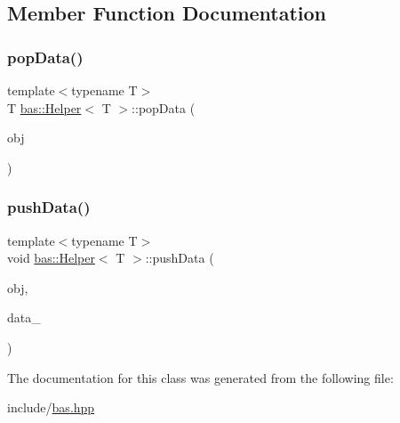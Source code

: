 \subsection{Member Function Documentation}
\mbox{\label{classbas_1_1Helper_a44946c3423be62b6f70556c1792bbc12}} 
\subsubsection{\texorpdfstring{popData()}{popData()}}
{\footnotesize\ttfamily template$<$typename T$>$ \\
T \mbox{\hyperlink{classbas_1_1Helper}{bas\+::\+Helper}}$<$ T $>$\+::pop\+Data (\begin{DoxyParamCaption}\item[{\mbox{\hyperlink{classbas_1_1SerializedObject}{Serialized\+Object}} \&}]{obj }\end{DoxyParamCaption})\hspace{0.3cm}{\ttfamily [inline]}}

\mbox{\label{classbas_1_1Helper_a14a82ecc9aa2a8580322f63dc7afde50}} 
\subsubsection{\texorpdfstring{pushData()}{pushData()}}
{\footnotesize\ttfamily template$<$typename T$>$ \\
void \mbox{\hyperlink{classbas_1_1Helper}{bas\+::\+Helper}}$<$ T $>$\+::push\+Data (\begin{DoxyParamCaption}\item[{\mbox{\hyperlink{classbas_1_1SerializedObject}{Serialized\+Object}} \&}]{obj,  }\item[{const T \&}]{data\+\_\+ }\end{DoxyParamCaption})\hspace{0.3cm}{\ttfamily [inline]}}



The documentation for this class was generated from the following file\+:\begin{DoxyCompactItemize}
\item 
include/\mbox{\hyperlink{bas_8hpp}{bas.\+hpp}}\end{DoxyCompactItemize}
